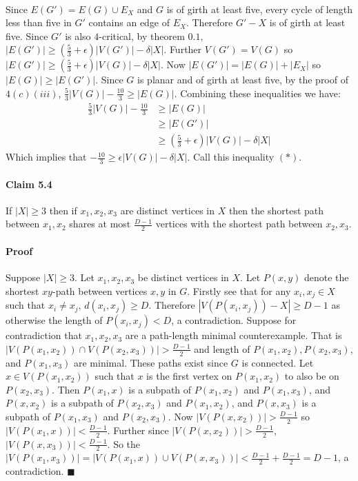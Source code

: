 \documentclass[letterpaper,12pt,oneside,onecolumn]{report}
\begin{document}
\paragraph{}
Since $E(G') = E(G) \cup E_X$ and $G$ is of girth at least five, every cycle of length less than five in $G'$ contains an edge of $E_X$. Therefore $G' - X$ is of girth at least five. Since $G'$ is also $4$-critical, by theorem $0.1$, $|E(G')| \geq (\frac{5}{3} + \epsilon)|V(G')| - \delta|X|$. Further $V(G') = V(G)$ so $|E(G')| \geq (\frac{5}{3} + \epsilon)|V(G)| - \delta|X|$. Now $|E(G')|  = |E(G)| + |E_X|$ so $|E(G)| \geq |E(G')|$. Since $G$ is planar and of girth at least five, by the proof of $4(c)(iii)$, $\frac{5}{3}|V(G)| -\frac{10}{3} \geq |E(G)|$. Combining these inequalities we have:
\begin{align*}
\frac{5}{3}|V(G)| -\frac{10}{3} &\geq |E(G)| \\
& \geq |E(G')| \\
& \geq (\frac{5}{3} + \epsilon)|V(G)| - \delta|X|
\end{align*}
Which implies that $-\frac{10}{3} \geq \epsilon|V(G)| - \delta|X|$. Call this inequality $(*)$.
\paragraph{Claim 5.4}
If $|X| \geq 3$ then if $x_1,x_2,x_3$ are distinct vertices in $X$ then the shortest path between $x_1,x_2$ shares at most $\frac{D-1}{2}$  vertices with the shortest path between $x_2,x_3$.
\paragraph{Proof}
Suppose $|X| \geq 3$. Let $x_1,x_2,x_3$ be distinct vertices in $X$. Let $P(x,y)$ denote the shortest $xy$-path between vertices $x,y$ in $G$. Firstly see that for any $x_i, x_j \in X$ such that $x_i \neq x_j$, $d(x_i, x_j) \geq D$. Therefore $|V(P(x_i,x_j)) - X| \geq D-1$ as otherwise the length of $P(x_i, x_j) < D$, a contradiction. Suppose for contradiction that $x_1,x_2,x_3$ are a path-length minimal counterexample. That is $|V(P(x_1,x_2)) \cap V(P(x_2,x_3))| > \frac{D-1}{2}$ and length of $P(x_1,x_2), P(x_2,x_3)$, and $P(x_1,x_3)$ are minimal. These paths exist since $G$ is connected. Let $x \in V(P(x_1,x_2))$ such that $x$ is the first vertex on $P(x_1,x_2)$ to also be on $P(x_2,x_3)$. Then $P(x_1,x)$ is a subpath of $P(x_1,x_2)$ and $P(x_1,x_3)$, and $P(x,x_2)$ is a subpath of $P(x_2,x_3)$ and $P(x_1,x_2)$, and $P(x,x_3)$ is a subpath of $P(x_1,x_3)$ and $P(x_2,x_3)$. Now $|V(P(x,x_2))| > \frac{D-1}{2}$ so $|V(P(x_1,x))| < \frac{D-1}{2}$. Further since $|V(P(x,x_2))| > \frac{D-1}{2}$, $|V(P(x,x_3))| < \frac{D-1}{2}$. So the $|V(P(x_1,x_3))| = |V(P(x_1,x)) \cup V(P(x,x_3))| < \frac{D-1}{2} + \frac{D-1}{2} = D-1$, a contradiction. $\blacksquare$
\end{document}
